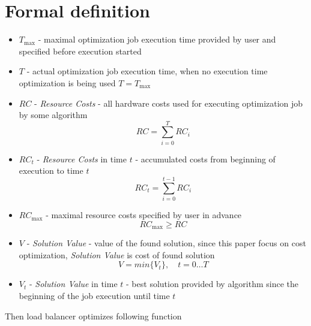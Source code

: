
\section{Formal definition}\label{sec:formal-definition}
\begin{itemize}
    \item $T_{\max}$ - maximal optimization job execution time provided by user and specified before execution started

    \item $T$ - actual optimization job execution time, when no execution time optimization is being used $T = T_{\max}$

    \item $RC$ - \textit{Resource Costs} - all hardware costs used for executing optimization job by some algorithm
    \begin{equation}
        RC = \sum_{i=0}^T RC_i
    \end{equation}

    \item $RC_t$ - \textit{Resource Costs} in time $t$ - accumulated costs from beginning of execution to time $t$
    \begin{equation}
        RC_{t} = \sum_{i=0}^{t-1} RC_i
    \end{equation}

    \item $RC_{\max}$ - maximal resource costs specified by user in advance
    \begin{equation}
        RC_{\max} \geq RC
    \end{equation}

    \item $V$ - \textit{Solution Value} - value of the found solution, since this paper focus on cost optimization,
    \textit{Solution Value} is cost of found solution
    \begin{equation}
        V = min \{ V_t \}, \quad t = 0 \dots T
    \end{equation}

    \item $V_t$ - \textit{Solution Value} in time $t$ - best solution provided by algorithm since the beginning of the job execution
    until time $t$

\end{itemize}

Then load balancer optimizes following function

